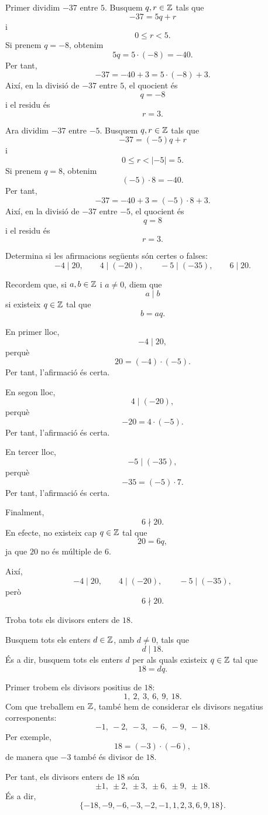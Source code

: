 \begin{solucio}
Primer dividim $-37$ entre $5$. Busquem $q,r\in\mathbb{Z}$ tals que
\[
-37=5q+r
\]
i
\[
0\leq r<5.
\]
Si prenem $q=-8$, obtenim
\[
5q=5\cdot(-8)=-40.
\]
Per tant,
\[
-37=-40+3=5\cdot(-8)+3.
\]
Així, en la divisió de $-37$ entre $5$, el quocient és
\[
q=-8
\]
i el residu és
\[
r=3.
\]

Ara dividim $-37$ entre $-5$. Busquem $q,r\in\mathbb{Z}$ tals que
\[
-37=(-5)q+r
\]
i
\[
0\leq r<|-5|=5.
\]
Si prenem $q=8$, obtenim
\[
(-5)\cdot 8=-40.
\]
Per tant,
\[
-37=-40+3=(-5)\cdot 8+3.
\]
Així, en la divisió de $-37$ entre $-5$, el quocient és
\[
q=8
\]
i el residu és
\[
r=3.
\]
\end{solucio}

\begin{exercici}[Divisibilitat en \(\Z\)]
Determina si les afirmacions següents són certes o falses:
\[
-4\mid 20,
\qquad
4\mid (-20),
\qquad
-5\mid (-35),
\qquad
6\mid 20.
\]
\end{exercici}

\begin{solucio}
Recordem que, si $a,b\in\mathbb{Z}$ i $a\neq 0$, diem que
\[
a\mid b
\]
si existeix $q\in\mathbb{Z}$ tal que
\[
b=aq.
\]

En primer lloc,
\[
-4\mid 20,
\]
perquè
\[
20=(-4)\cdot(-5).
\]
Per tant, l'afirmació és certa.

En segon lloc,
\[
4\mid (-20),
\]
perquè
\[
-20=4\cdot(-5).
\]
Per tant, l'afirmació és certa.

En tercer lloc,
\[
-5\mid (-35),
\]
perquè
\[
-35=(-5)\cdot 7.
\]
Per tant, l'afirmació és certa.

Finalment,
\[
6\nmid 20.
\]
En efecte, no existeix cap $q\in\mathbb{Z}$ tal que
\[
20=6q,
\]
ja que $20$ no és múltiple de $6$.

Així,
\[
-4\mid 20,\qquad 4\mid (-20),\qquad -5\mid (-35),
\]
però
\[
6\nmid 20.
\]
\end{solucio}


\begin{exercici}
Troba tots els divisors enters de $18$.
\end{exercici}

\begin{solucio}
Busquem tots els enters $d\in\mathbb{Z}$, amb $d\neq 0$, tals que
\[
d\mid 18.
\]
És a dir, busquem tots els enters $d$ per als quals existeix $q\in\mathbb{Z}$ tal que
\[
18=dq.
\]

Primer trobem els divisors positius de $18$:
\[
1,\ 2,\ 3,\ 6,\ 9,\ 18.
\]
Com que treballem en $\Z$, també hem de considerar els divisors negatius corresponents:
\[
-1,\ -2,\ -3,\ -6,\ -9,\ -18.
\]
Per exemple,
\[
18=(-3)\cdot(-6),
\]
de manera que $-3$ també és divisor de $18$.

Per tant, els divisors enters de $18$ són
\[
\pm 1,\ \pm 2,\ \pm 3,\ \pm 6,\ \pm 9,\ \pm 18.
\]
És a dir,
\[
\{-18,-9,-6,-3,-2,-1,1,2,3,6,9,18\}.
\]
\end{solucio}



